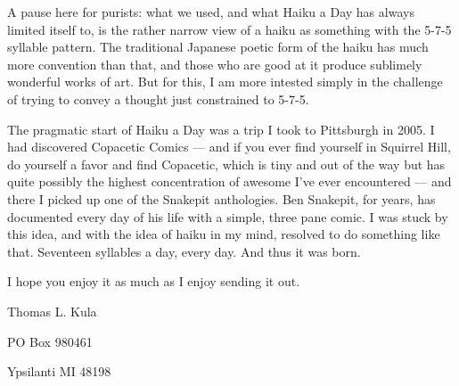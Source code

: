\documentclass[12pt]{article}
\begin{document}
A pause here for purists: what we used, and what Haiku a Day
has always limited itself to, is the rather narrow view of
a haiku as something with the 5-7-5 syllable pattern. The 
traditional Japanese poetic form of the haiku has much more
convention than that, and those who are good at it produce
sublimely wonderful works of art. But for this, I am more
intested simply in the challenge of trying to convey a 
thought just constrained to 5-7-5.

The pragmatic start of Haiku a Day was a trip I took to
Pittsburgh in 2005. I had discovered Copacetic Comics ---
and if you ever find yourself in Squirrel Hill, do
yourself a favor and find Copacetic, which is tiny and
out of the way but has quite possibly the highest concentration
of awesome I've ever encountered --- and there I picked up
one of the Snakepit anthologies. Ben Snakepit, for years,
has documented every day of his life with a simple, three
pane comic. I was stuck by this idea, and with the idea of
haiku in my mind, resolved to do something like that.
Seventeen syllables a day, every day. And thus it was
born.

I hope you enjoy it as much as I enjoy sending it out.

\newpage

\thispagestyle{empty}
\vspace*{14cm}
\begin{sideways}
\Large{Thomas L. Kula}
\end{sideways}
\begin{sideways}
\Large{PO Box 980461}
\end{sideways}
\begin{sideways}
\Large{Ypsilanti MI 48198}
\end{sideways}
\end{document}
